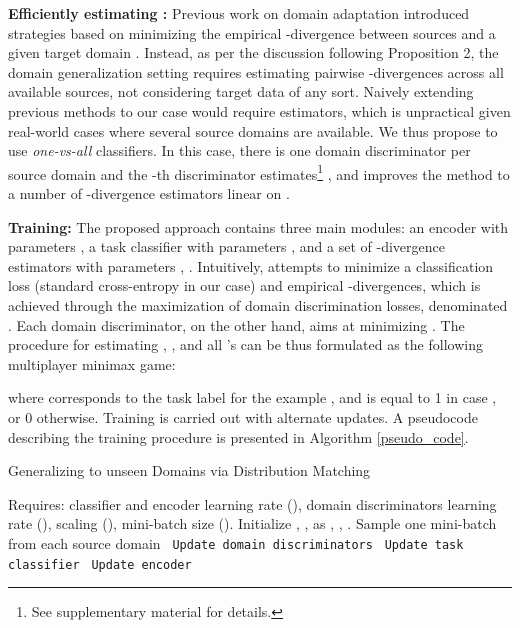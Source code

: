 \documentclass{article}
\begin{document}
\textbf{Efficiently estimating :} Previous work on domain adaptation introduced strategies based on minimizing the empirical -divergence between sources and a given target domain \cite{ganin2016domain, zhao2018adversarial}. Instead, as per the discussion following Proposition 2, the domain generalization setting requires estimating pairwise -divergences across all available sources, not considering target data of any sort. Naively extending previous methods to our case would require  estimators, which is unpractical given real-world cases where several source domains are available. We thus propose to use {\em one-vs-all} classifiers. In this case, there is one domain discriminator per source domain and the -th discriminator estimates\footnote{\label{fn:supmat}See supplementary material for details.} , and improves the method to a number of -divergence estimators linear on .

\textbf{Training:} 
The proposed approach contains three main modules: an encoder  with parameters , a task classifier  with parameters , and a set of -divergence estimators  with parameters , . Intuitively,  attempts to minimize a classification loss  (standard cross-entropy in our case) and empirical -divergences, which is achieved through the maximization of domain discrimination losses, denominated . Each domain discriminator, on the other hand, aims at minimizing . The procedure for estimating , , and all 's can be thus formulated as the following multiplayer minimax game:   

where  corresponds to the task label for the example , and  is equal to 1 in case , or 0 otherwise. 
Training is carried out with alternate updates. A pseudocode describing the training procedure is presented in Algorithm \ref{pseudo_code}.

\begin{algorithm*}[h]
\caption{Generalizing to unseen Domains via Distribution Matching}\label{pseudo_code}
\begin{algorithmic}[1]
\STATE Requires: classifier and encoder learning rate (), domain discriminators learning rate (), scaling (), mini-batch size ().
\STATE Initialize , ,  as , , . 
\STATE Sample one mini-batch from each source domain 
\STATE \texttt{ Update domain discriminators}
\FOR {}
\STATE 
\ENDFOR
\STATE \texttt{ Update task classifier}
\STATE 
\STATE \texttt{ Update encoder}
\STATE   \\ 

\ENDFOR
\end{algorithmic}
\end{algorithm*}
\end{document}
